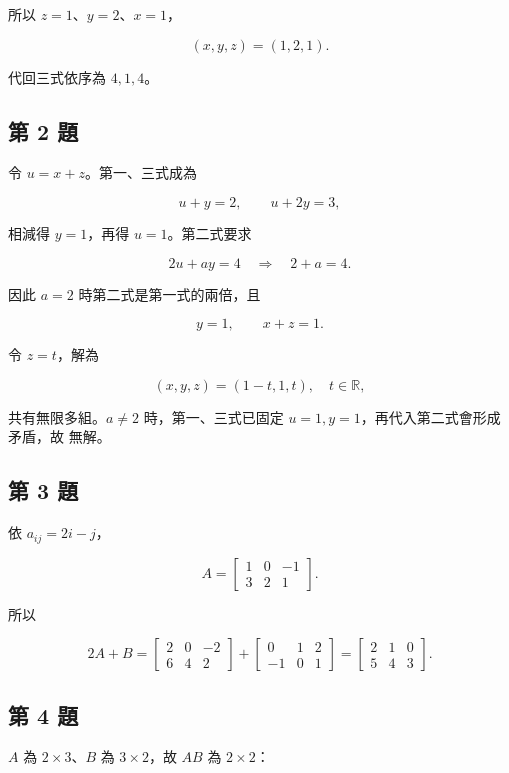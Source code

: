\documentclass[11pt,a4paper]{article}
\begin{document}
所以 \(z=1\)、\(y=2\)、\(x=1\)，

\[
\boxed{(x,y,z)=(1,2,1)}.
\]

代回三式依序為 \(4,1,4\)。

\subsection{第 2 題}\label{ux7b2c-2-ux984c}

令 \(u=x+z\)。第一、三式成為

\[
u+y=2,\qquad u+2y=3,
\]

相減得 \(y=1\)，再得 \(u=1\)。第二式要求

\[
2u+ay=4
\quad\Longrightarrow\quad
2+a=4.
\]

因此 \(a=2\) 時第二式是第一式的兩倍，且

\[
y=1,\qquad x+z=1.
\]

令 \(z=t\)，解為

\[
\boxed{(x,y,z)=(1-t,1,t),\quad t\in\mathbb R},
\]

共有無限多組。\(a\ne2\) 時，第一、三式已固定 \(u=1,y=1\)，再代入第二式會形成矛盾，故 \(\boxed{\text{無解}}\)。

\subsection{第 3 題}\label{ux7b2c-3-ux984c}

依 \(a_{ij}=2i-j\)，

\[
A=\begin{bmatrix}
1&0&-1\\
3&2&1
\end{bmatrix}.
\]

所以

\[
2A+B
=
\begin{bmatrix}
2&0&-2\\
6&4&2
\end{bmatrix}
+
\begin{bmatrix}
0&1&2\\
-1&0&1
\end{bmatrix}
=
\boxed{\begin{bmatrix}2&1&0\\5&4&3\end{bmatrix}}.
\]

\subsection{第 4 題}\label{ux7b2c-4-ux984c}

\(A\) 為 \(2\times3\)、\(B\) 為 \(3\times2\)，故 \(AB\) 為 \(2\times2\)：
\end{document}
